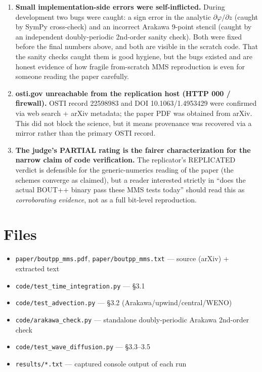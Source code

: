 \documentclass[11pt]{article}
\begin{document}
\begin{enumerate}
  \item \textbf{Small implementation-side errors were self-inflicted.} During development two bugs were caught: a sign error in the analytic $\partial\varphi/\partial z$ (caught by SymPy cross-check) and an incorrect Arakawa 9-point stencil (caught by an independent doubly-periodic 2nd-order sanity check). Both were fixed before the final numbers above, and both are visible in the scratch code. That the sanity checks caught them is good hygiene, but the bugs existed and are honest evidence of how fragile from-scratch MMS reproduction is even for someone reading the paper carefully.
  \item \textbf{osti.gov unreachable from the replication host (HTTP 000 / firewall).} OSTI record 22598983 and DOI 10.1063/1.4953429 were confirmed via web search + arXiv metadata; the paper PDF was obtained from arXiv. This did not block the science, but it means provenance was recovered via a mirror rather than the primary OSTI record.
  \item \textbf{The judge's PARTIAL rating is the fairer characterization for the narrow claim of code verification.} The replicator's REPLICATED verdict is defensible for the generic-numerics reading of the paper (the schemes converge as claimed), but a reader interested strictly in ``does the actual BOUT++ binary pass these MMS tests today'' should read this as \emph{corroborating evidence}, not as a full bit-level reproduction.
\end{enumerate}

\section{Files}
\begin{itemize}
  \item \verb|paper/boutpp_mms.pdf|, \verb|paper/boutpp_mms.txt| --- source (arXiv) + extracted text
  \item \verb|code/test_time_integration.py| --- \S3.1
  \item \verb|code/test_advection.py| --- \S3.2 (Arakawa/upwind/central/WENO)
  \item \verb|code/arakawa_check.py| --- standalone doubly-periodic Arakawa 2nd-order check
  \item \verb|code/test_wave_diffusion.py| --- \S3.3--3.5
  \item \verb|results/*.txt| --- captured console output of each run
\end{itemize}
\end{document}
